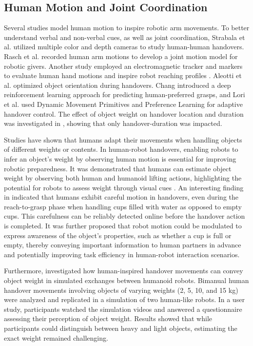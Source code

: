 \subsection{Human Motion and Joint Coordination}
Several studies model human motion to inspire robotic arm movements.
To better understand verbal and non-verbal cues, as well as joint coordination, Strabala et al. \cite{When_where_how_human-human_studyStrabala} utilized multiple color and depth cameras to study human-human handovers. Rasch et al. \cite{human-like-motion-forR2H_Handovers_Rasch2018AJM} recorded human arm motions to develop a joint motion model for robotic givers. Another study employed an electromagnetic tracker and markers to evaluate human hand motions and inspire robot reaching profiles \cite{robot_reaching_profiles_4600651}. Aleotti et al. \cite{aleotti2014affordance} optimized object orientation during handovers. Chang \cite{chang2021learning} introduced a deep reinforcement learning approach for predicting human-preferred grasps, and Lori et al. \cite{iori2023dmp,perovic2023adaptive} used Dynamic Movement Primitives and Preference Learning for adaptive handover control. 
The effect of object weight on handover location and duration was investigated in \cite{h2H_handovers_how_dis_and_obj_mass_matter_Clint2017}, showing that only handover-duration was impacted. 

Studies have shown that humans adapt their movements when handling objects of different weights or contents. In human-robot handovers, enabling robots to infer an object's weight by observing human motion is essential for improving robotic preparedness.
It was demonstrated that humans can estimate object weight by observing both human and humanoid lifting actions, highlighting the potential for robots to assess weight through visual cues \cite{Sciutti2014_weight_motion}. 
An interesting finding in \cite{careful_handovers_Lastrico} indicated that humans exhibit careful motion in handovers, even during the reach-to-grasp phase when handling cups filled with water as opposed to empty cups. This carefulness can be reliably detected online before the handover action is completed. It was further proposed that robot motion could be modulated to express awareness of the object's properties, such as whether a cup is full or empty, thereby conveying important information to human partners in advance and potentially improving task efficiency in human-robot interaction scenarios.

Furthermore, \cite{humanoids_simulated_motion_objectweight2009} investigated how human-inspired handover movements can convey object weight in simulated exchanges between humanoid robots. Bimanual human handover movements involving objects of varying weights (2, 5, 10, and 15 kg) were analyzed and replicated in a simulation of two human-like robots. In a user study, participants watched the simulation videos and answered a questionnaire assessing their perception of object weight. Results showed that while participants could distinguish between heavy and light objects, estimating the exact weight remained challenging.

